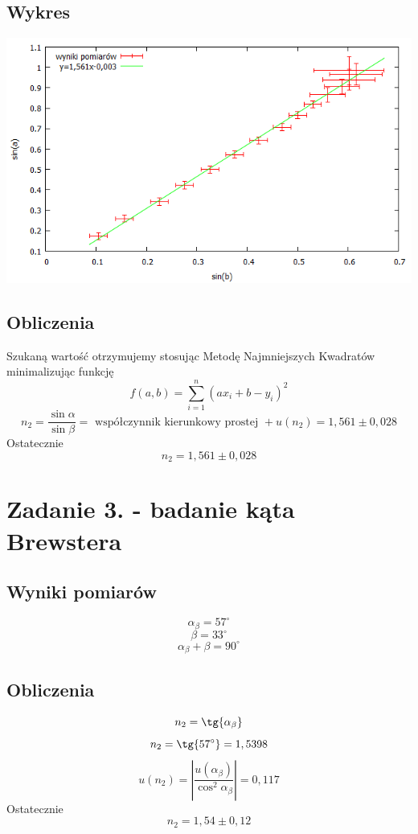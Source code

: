 \documentclass[10pt,a4paper]{article}
\begin{document}
\subsection{Wykres}
\includegraphics[width=15cm]{sinasinb.png}
\subsection{Obliczenia}
Szukaną wartość otrzymujemy stosując Metodę Najmniejszych Kwadratów minimalizując funkcję
\begin{equation}
	f(a,b) = \sum_{i=1}^n (ax_i+b-y_i)^2
\end{equation}
\begin{equation}
n_2 = \frac{\sin\alpha}{\sin\beta}=\text{ współczynnik kierunkowy prostej } +u(n_2) = 1,561 \pm 0,028
\end{equation} 
Ostatecznie
\begin{equation}
n_2 = 1,561 \pm 0,028
\end{equation} 
\section{Zadanie 3. - badanie kąta Brewstera}
\subsection{Wyniki pomiarów}
\begin{equation}
\alpha_\beta = 57^\circ
\end{equation} 
\begin{equation}
\beta = 33^\circ
\end{equation} 
\begin{equation}
\alpha_\beta + \beta = 90^\circ
\end{equation} 
\subsection{Obliczenia}
\begin{equation}
n_2 = \tg{\alpha_\beta}
\end{equation} 
\begin{equation}
n_2 = \tg{57^\circ} = 1,5398
\end{equation} 
\begin{equation}
u(n_2) = |\frac{u(\alpha_\beta)}{\cos^2{\alpha_\beta}} |= 0,117 
\end{equation} 
Ostatecznie
\begin{equation}
n_2 = 1,54 \pm 0,12
\end{equation} 
\end{document}
